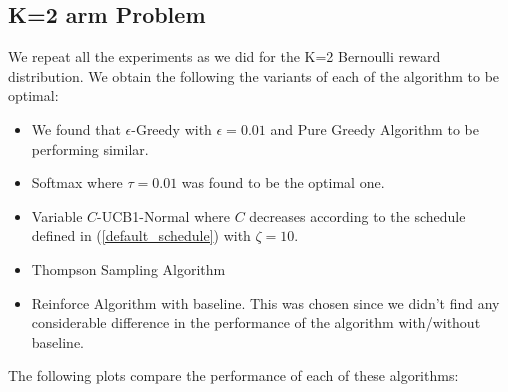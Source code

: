 \documentclass{article}
\begin{document}
	\subsection{K=2 arm Problem}
		We repeat all the experiments as we did for the K=2 Bernoulli reward distribution. We obtain the following the variants of each of the algorithm to be optimal:
		\begin{itemize}
			\item We found that $\epsilon$-Greedy with $\epsilon=0.01$ and Pure Greedy Algorithm to be performing similar.
			\item Softmax where $\tau=0.01$ was found to be the optimal one.
			\item Variable $C$-UCB1-Normal where $C$ decreases according to the schedule defined in (\ref{default_schedule}) with $\zeta=10$.
			\item Thompson Sampling Algorithm
			\item Reinforce Algorithm with baseline. This was chosen since we didn't find any considerable difference in the performance of the algorithm with/without
				baseline.
		\end{itemize}
		
		The following plots compare the performance of each of these algorithms:
		
\end{document}
